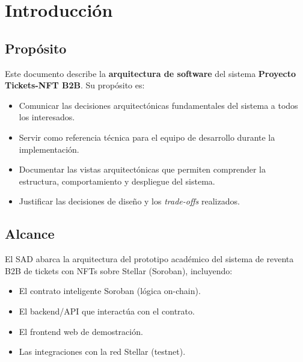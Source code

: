 \documentclass[12pt,oneside]{article}
\newcommand{\shortname}{Proyecto Tickets-NFT B2B}
\begin{document}
\newpage

\tableofcontents
\newpage
\listoffigures
\listoftables
\clearpage


\section{Introducción}
\label{sec:introduccion}

\subsection{Propósito}
\label{subsec:proposito}

Este documento describe la \textbf{arquitectura de software} del sistema \textbf{\shortname}. Su propósito es:

\begin{itemize}
  \item Comunicar las decisiones arquitectónicas fundamentales del sistema a todos los interesados.
  \item Servir como referencia técnica para el equipo de desarrollo durante la implementación.
  \item Documentar las vistas arquitectónicas que permiten comprender la estructura, comportamiento y despliegue del sistema.
  \item Justificar las decisiones de diseño y los \textit{trade-offs} realizados.
\end{itemize}

\subsection{Alcance}
\label{subsec:alcance}

El SAD abarca la arquitectura del prototipo académico del sistema de reventa B2B de tickets con NFTs sobre Stellar (Soroban), incluyendo:

\begin{itemize}
  \item El contrato inteligente Soroban (lógica on-chain).
  \item El backend/API que interactúa con el contrato.
  \item El frontend web de demostración.
  \item Las integraciones con la red Stellar (testnet).
\end{itemize}
\end{document}
